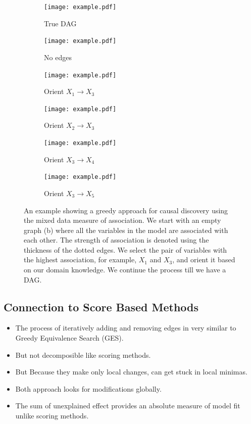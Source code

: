 \documentclass{uai2025} %
\begin{document}
\begin{figure}
	\begin{subfigure}{0.17 \textwidth}
		\texttt{[image: example.pdf]}
		\caption{True DAG}
	\end{subfigure}%
	\begin{subfigure}{0.17 \textwidth}
		\texttt{[image: example.pdf]}
		\caption{No edges}
	\end{subfigure}%
	\begin{subfigure}{0.17 \textwidth}
		\texttt{[image: example.pdf]}
		\caption{Orient $ X_1 \rightarrow X_3 $}
	\end{subfigure}
	\begin{subfigure}{0.17 \textwidth}
		\texttt{[image: example.pdf]}
		\caption{Orient $ X_2 \rightarrow X_3 $}
	\end{subfigure}%
	\begin{subfigure}{0.17 \textwidth}
		\texttt{[image: example.pdf]}
		\caption{Orient $ X_3 \rightarrow X_4 $}
	\end{subfigure}%
	\begin{subfigure}{0.17 \textwidth}
		\texttt{[image: example.pdf]}
		\caption{Orient $ X_3 \rightarrow X_5 $}
	\end{subfigure}
	\caption{An example showing a greedy approach for causal discovery using the mixed data measure of association. We start with an empty graph (b) where all the variables in the model are associated with each other. The strength of association is denoted using the thickness of the dotted edges. We select the pair of variables with the highest association, for example, $X_1$ and $X_3$, and orient it based on our domain knowledge. We continue the process till we have a DAG.
	}
\end{figure}

\subsection{Connection to Score Based Methods}
\begin{itemize}
	\item The process of iteratively adding and removing edges in very similar to
		Greedy Equivalence Search (GES).
	\item But not decomposible like scoring methods. 
	\item But Because they make only local changes, can get stuck in local minimas.
	\item Both approach looks for modifications globally.
	\item The sum of unexplained effect provides an absolute measure of model fit 
		unlike scoring methods.
\end{itemize}
\end{document}
